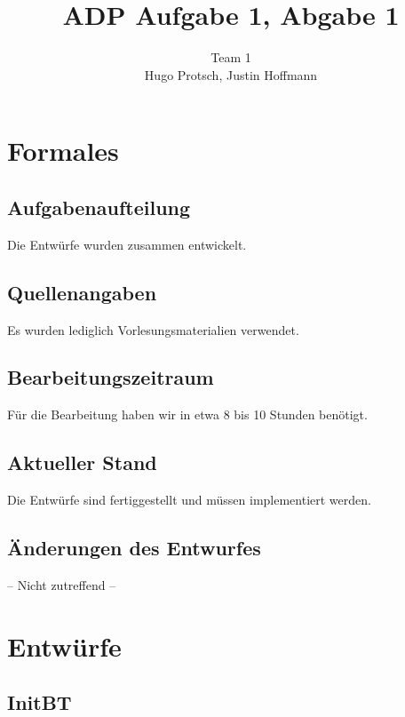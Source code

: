 \documentclass[11pt]{article}
\title{ADP Aufgabe 1, Abgabe 1}
\author{Team 1\\Hugo Protsch, Justin Hoffmann}
\begin{document}
    \maketitle


    \section{Formales}\label{sec:Formales}


    \subsection{Aufgabenaufteilung}
    Die Entwürfe wurden zusammen entwickelt.

    \subsection{Quellenangaben}
    
    Es wurden lediglich Vorlesungsmaterialien verwendet.


    \subsection{Bearbeitungszeitraum}
    Für die Bearbeitung haben wir in etwa 8 bis 10 Stunden benötigt.

    \subsection{Aktueller Stand}
    Die Entwürfe sind fertiggestellt und müssen implementiert werden.


    \subsection{Änderungen des Entwurfes}
    -- Nicht zutreffend --


    \section{Entwürfe}\label{sec:entwuerfe}

    \subsection{InitBT}\label{subsec:initbt}
    
\end{document}
